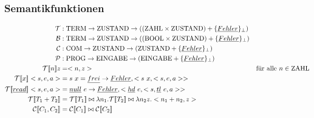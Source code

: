 \subsubsection{Semantikfunktionen}
\begin{align*}
\mathcal{T} &: \text{\lstinline!TERM!} \rightarrow \text{\lstinline!ZUSTAND!} \rightarrow ((\text{\lstinline!ZAHL!} \times \text{\lstinline!ZUSTAND!} ) + \{\underline{Fehler}\}_\perp)\\
\mathcal{B} &: \text{\lstinline!TERM!} \rightarrow \text{\lstinline!ZUSTAND!} \rightarrow ((\text{\lstinline!BOOL!} \times \text{\lstinline!ZUSTAND!} ) + \{\underline{Fehler}\}_\perp)\\
\mathcal{C} &: \text{\lstinline!COM!} \rightarrow \text{\lstinline!ZUSTAND!} \rightarrow (\text{\lstinline!ZUSTAND!} + \{\underline{Fehler}\}_\perp)\\
\mathcal{P} &: \text{\lstinline!PROG!} \rightarrow \text{\lstinline!EINGABE!} \rightarrow (\text{\lstinline!EINGABE!} + \{\underline{Fehler}\}_\perp)\\
\mathcal{T} [\![ n ]\!] z &= <n,z> & \text{für alle } n \in \text{\lstinline!ZAHL!}\\
\mathcal{T} [\![ x ]\!] <s,e,a> &= s\ x = \underline{frei} \rightarrow \underline{Fehler}, <s\ x, <s,e,a>>\\
\mathcal{T} [\![ \underline{read} ]\!] <s,e,a> &= \underline{null}\ e \rightarrow \underline{Fehler}, <\underline{hd}\ e, <s, \underline{tl}\ e, a>>\\
\mathcal{T} [\![ T_1 + T_2 ]\!]  &= \mathcal{T} [\![ T_1]\!]  \bowtie \lambda n_1.\mathcal{T} [\![ T_2 ]\!]  \bowtie \lambda n_2 z . <n_1 + n_2, z>\\
\mathcal{C} [\![ C_1, C_2 ]\!]  &= \mathcal{C} [\![ C_1]\!]  \bowtie \mathcal{C} [\![ C_2]\!]  
\end{align*}